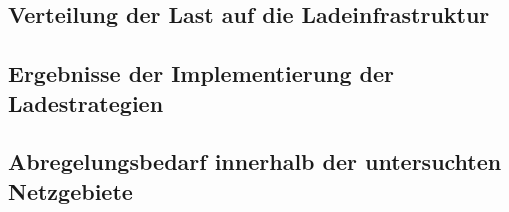 \subsection{Verteilung der Last auf die Ladeinfrastruktur}\label{chap:distribute_demand_ev}



\subsection{Ergebnisse der Implementierung der Ladestrategien}\label{chap:results_charging_strategies}


\subsection{Abregelungsbedarf innerhalb der untersuchten Netzgebiete}

